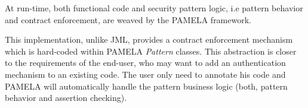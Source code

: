 

At run-time, both functional code and security pattern logic, i.e pattern behavior and contract enforcement, are weaved by the PAMELA framework. 


This implementation, unlike JML, provides a contract enforcement mechanism which is hard-coded within PAMELA \emph{Pattern} classes. This abstraction is closer to the requirements of the end-user, who may want to add an authentication mechanism to an existing code. The user only need to annotate his code and PAMELA will automatically handle the pattern business logic (both, pattern behavior and assertion checking).

